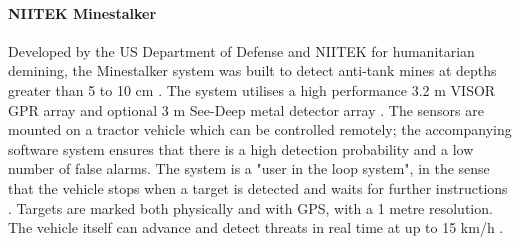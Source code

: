\documentclass[main.tex]{subfiles}
\begin{document}
\begin{appendices}
\paragraph{NIITEK Minestalker} Developed by the US Department of Defense and NIITEK for humanitarian demining, the Minestalker system was built to detect anti-tank mines at depths greater than 5 to 10 cm \parencite{laudato2014}. The system utilises a high performance 3.2 m VISOR GPR array and optional 3 m See-Deep metal detector array \parencite{niitek2015}. The sensors are mounted on a tractor vehicle which can be controlled remotely; the accompanying software system ensures that there is a high detection probability and a low number of false alarms. The system is a "user in the loop system", in the sense that the vehicle stops when a target is detected and waits for further instructions \parencite{laudato2014}. Targets are marked both physically and with GPS, with a 1 metre resolution. The vehicle itself can advance and detect threats in real time at up to 15 km/h \parencite{niitek2015}.





\end{appendices}
\end{document}
